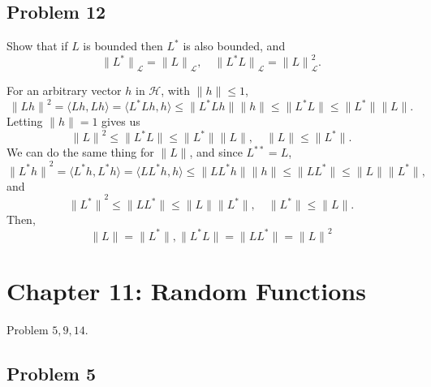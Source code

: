 \documentclass{article}
\theoremstyle{definition}
\numberwithin{equation}{section}
\begin{document}
\subsection{Problem 12}

\begin{problem}
Show that if $L$ is bounded then $L^{*}$ is also bounded, and
$$ {\lVert L^{*} \rVert}_{\mathcal{L}} = {\lVert L \rVert}_{\mathcal{L}}, \quad
{\lVert L^{*}L \rVert}_{\mathcal{L}} = {\lVert L \rVert}^{2}_{\mathcal{L}}.
$$
\end{problem}

\begin{mysol}
For an arbitrary vector $h$ in $\mathcal{H}$, with $\lVert h \rVert \leq 1$,
$$
{\lVert Lh \rVert}^{2} = \langle Lh, Lh \rangle = \langle L^{*}Lh, h \rangle
\leq \lVert L^{*}Lh \rVert \lVert h \rVert \leq \lVert L^{*}L \rVert \leq \lVert L^{*} \rVert \lVert L \rVert .
$$
Letting $\lVert h \rVert = 1$ gives us
$$ {\lVert L \rVert}^{2} \leq \lVert L^{*}L \rVert \leq \lVert L^{*} \rVert \lVert L \rVert, \quad \lVert L \rVert \leq \lVert L^{*} \rVert .$$
We can do the same thing for $\lVert L \rVert$, and since $L^{**} = L$, 
$$
{\lVert L^{*}h \rVert}^{2} = \langle L^{*}h, L^{*}h \rangle = \langle LL^{*}h, h \rangle
\leq \lVert LL^{*}h \rVert \lVert h \rVert \leq \lVert LL^{*} \rVert \leq \lVert L \rVert \lVert L^{*} \rVert,
$$
and
$$ {\lVert L^{*} \rVert}^{2} \leq \lVert LL^{*} \rVert \leq \lVert L \rVert \lVert L^{*} \rVert, \quad \lVert L^{*} \rVert \leq \lVert L \rVert .$$
Then, 
$$ \lVert L \rVert = \lVert L^{*} \rVert , \lVert L^{*}L \rVert = \lVert LL^{*} \rVert = {\lVert L \rVert}^{2} $$

\end{mysol}




\bigskip

\section{Chapter 11: Random Functions}

Problem $5, 9, 14$.


\subsection{Problem 5}
\end{document}
